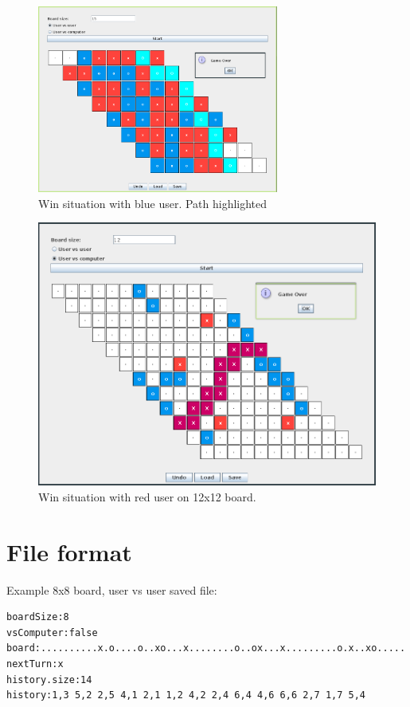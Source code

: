 \documentclass[11pt]{article}
\begin{document}
\begin{figure}[htbp]
\centering
\includegraphics[width=300px]{GUI_Design/2021-01-29_14-59-26_screenshot.png}
\caption{Win situation with blue user. Path highlighted}
\end{figure}


\begin{figure}[H]
\centering
\includegraphics[width=.9\linewidth]{GUI_Design/2021-01-29_15-05-55_screenshot.png}
\caption{Win situation with red user on 12x12 board.}
\end{figure}


\section{File format}
\label{sec:org6167ce2}
Example 8x8 board, user vs user saved file:
\begin{verbatim}
boardSize:8
vsComputer:false
board:..........x.o....o..xo...x........o..ox...x.........o.x..xo.....
nextTurn:x
history.size:14
history:1,3 5,2 2,5 4,1 2,1 1,2 4,2 2,4 6,4 4,6 6,6 2,7 1,7 5,4 
\end{verbatim}
\end{document}
